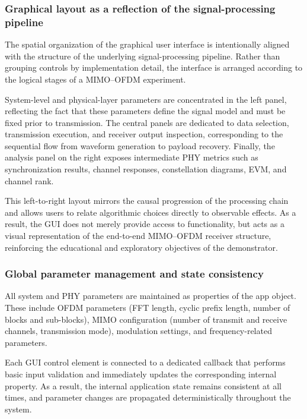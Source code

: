 \subsubsection{Graphical layout as a reflection of the signal-processing pipeline}
\label{sec:gui_layout_pipeline}

The spatial organization of the graphical user interface is intentionally aligned with the structure of the underlying signal-processing pipeline.
Rather than grouping controls by implementation detail, the interface is arranged according to the logical stages of a MIMO--OFDM experiment.

System-level and physical-layer parameters are concentrated in the left panel, reflecting the fact that these parameters define the signal model and must be fixed prior to transmission.
The central panels are dedicated to data selection, transmission execution, and receiver output inspection, corresponding to the sequential flow from waveform generation to payload recovery.
Finally, the analysis panel on the right exposes intermediate PHY metrics such as synchronization results, channel responses, constellation diagrams, EVM, and channel rank.

This left-to-right layout mirrors the causal progression of the processing chain and allows users to relate algorithmic choices directly to observable effects.
As a result, the GUI does not merely provide access to functionality, but acts as a visual representation of the end-to-end MIMO--OFDM receiver structure, reinforcing the educational and exploratory objectives of the demonstrator.

\subsubsection{Global parameter management and state consistency}
\label{sec:gui_state_management}

All system and PHY parameters are maintained as properties of the app object. These include OFDM parameters (FFT length, cyclic prefix length, number of blocks and sub-blocks), MIMO configuration (number of transmit and receive channels, transmission mode), modulation settings, and frequency-related parameters.

Each GUI control element is connected to a dedicated  callback that performs basic input validation and immediately updates the corresponding internal property. As a result, the internal application state remains consistent at all times, and parameter changes are propagated deterministically throughout the system.


